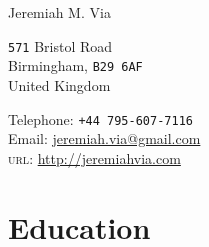 \documentclass[10pt, a4paper]{article}
\begin{document}
{\LARGE Jeremiah M. Via}\\[1cm]
\begin{minipage}[t]{0.55\textwidth}
  \texttt{571} Bristol Road\\
  Birmingham, \texttt{B29 6AF}\\
  United Kingdom
\end{minipage}
\begin{minipage}[t]{0.4\textwidth}
  Telephone: \texttt{+44 795-607-7116}\\
  Email: \href{mailto:jeremiah.via@gmail.com}{jeremiah.via@gmail.com}\\
  \textsc{url}: \href{http://jeremiahvia.com}{http://jeremiahvia.com}
\end{minipage}


\section*{Education}
\end{document}
